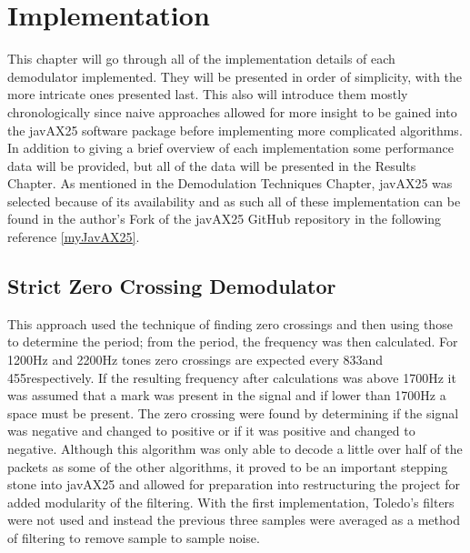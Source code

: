 \chapter{Implementation}

This chapter will go through all of the implementation details of each demodulator implemented. They will be presented in order of simplicity, with the more intricate ones presented last. This also will introduce them mostly chronologically since naive approaches allowed for more insight to be gained into the javAX25 software package before implementing more complicated algorithms. In addition to giving a brief overview of each implementation some performance data will be provided, but all of the data will be presented in the Results Chapter. As mentioned in the Demodulation Techniques Chapter, javAX25 was selected because of its availability and as such all of these implementation can be found in the author's Fork of the javAX25 GitHub repository in the following reference \ref{myJavAX25}. 

\section{Strict Zero Crossing Demodulator}
This approach used the technique of finding zero crossings and then using those to determine the period; from the period, the frequency was then calculated. For 1200Hz and 2200Hz tones zero crossings are expected every 833\mus and 455\mus respectively. If the resulting frequency after calculations was above 1700Hz it was assumed that a mark was present in the signal and if lower than 1700Hz a space must be present. The zero crossing were found by determining if the signal was negative and changed to positive or if it was positive and changed to negative. Although this algorithm was only able to decode a little over half of the packets as some of the other algorithms, it proved to be an important stepping stone into javAX25 and allowed for preparation into restructuring the project for added modularity of the filtering. With the first implementation, Toledo's filters were not used and instead the previous three samples were averaged as a method of filtering to remove sample to sample noise.

